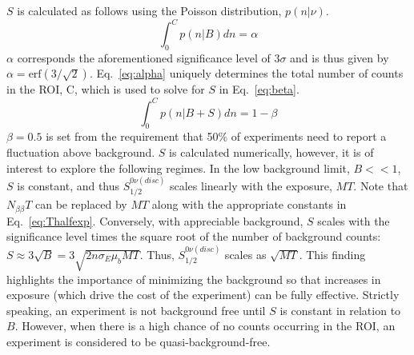 $S$ is calculated as follows using the Poisson distribution, $p(n|\nu)$.
\begin{equation}
	\int_{0}^{C}p(n|B)dn = \alpha
	\label{eq:alpha}
\end{equation}
$\alpha$ corresponds the aforementioned significance level of 3$\sigma$ and is thus given by $\alpha = \text{erf}(3/\sqrt{2})$. Eq.~\ref{eq:alpha} uniquely determines the total number of counts in the ROI, C, which is used to solve for $S$ in Eq.~\ref{eq:beta}.
\begin{equation}
	\int_{0}^{C}p(n|B+S)dn = 1-\beta
	\label{eq:beta}
\end{equation}
$\beta = 0.5$ is set from the requirement that 50\% of experiments need to report a fluctuation above background. $S$ is calculated numerically, however, it is of interest to explore the following regimes. In the low background limit, $B<<1$, $S$ is constant, and thus $S^{0\nu(disc)}_{1/2}$ scales linearly with the exposure, $MT$. Note that $N_{\beta\beta}T$ can be replaced by $MT$ along with the appropriate constants in Eq.~\ref{eq:Thalfexp}. Conversely, with appreciable background, $S$ scales with the significance level times the square root of the number of background counts: $S \approx 3 \sqrt B = 3\sqrt{2n\sigma_E\mu_bMT}$. Thus, $S^{0\nu(disc)}_{1/2}$ scales as $\sqrt{MT}$. This finding highlights the importance of minimizing the background so that increases in exposure (which drive the cost of the experiment) can be fully effective. Strictly speaking, an experiment is not background free until $S$ is constant in relation to $B$. However, when there is a high chance of no counts occurring in the ROI, an experiment is considered to be quasi-background-free. 

